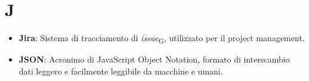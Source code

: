 \section*{J}  
\begin{itemize}
    \item \textbf{Jira}: Sistema di tracciamento di \textit{issue}\textsubscript{G}, utilizzato per il project management.
    \item \textbf{JSON}: Acronimo di JavaScript Object Notation, formato di interscambio dati leggero e facilmente leggibile da macchine e umani.
\end{itemize}

